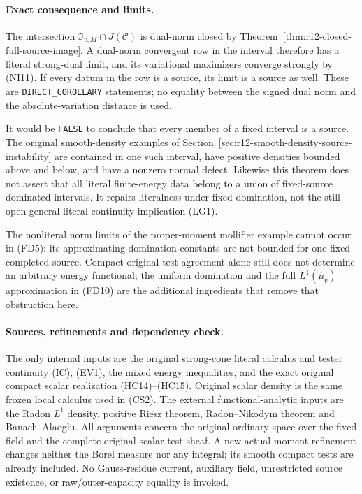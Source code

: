 \paragraph{Exact consequence and limits.}
The intersection
$\mathfrak I_{v,M}\cap J(\mathscr C)$ is dual-norm closed by
Theorem~\ref{thm:r12-closed-full-source-image}. A dual-norm
convergent row in the interval therefore has a literal strong-dual
limit, and its variational maximizers converge strongly by
\textup{(NI11)}. If every datum in the row is a source, its limit
is a source as well. These are \texttt{DIRECT\_COROLLARY}
statements; no equality between the signed dual norm and the
absolute-variation distance is used.

It would be \texttt{FALSE} to conclude that every member of a
fixed interval is a source. The original smooth-density examples
of Section~\ref{sec:r12-smooth-density-source-instability} are
contained in one such interval, have positive densities bounded
above and below, and have a nonzero normal defect. Likewise this
theorem does not assert that all literal finite-energy data belong
to a union of fixed-source dominated intervals. It repairs
literalness under fixed domination, not the still-open general
literal-continuity implication \textup{(LG1)}.

The nonliteral norm limits of the proper-moment mollifier example
cannot occur in \textup{(FD5)}: its approximating domination
constants are not bounded for one fixed completed source. Compact
original-test agreement alone still does not determine an arbitrary
energy functional; the uniform domination and the full
$L^1(\widehat\mu_v)$ approximation in \textup{(FD10)} are the
additional ingredients that remove that obstruction here.

\paragraph{Sources, refinements and dependency check.}
The only internal inputs are the original strong-cone literal
calculus and tester continuity \textup{(IC), (EV1)}, the mixed
energy inequalities, and the exact original compact scalar
realization \textup{(HC14)--(HC15)}. Original scalar density is
the same frozen local calculus used in \textup{(CS2)}. The
external functional-analytic inputs are the Radon $L^1$ density,
positive Riesz theorem, Radon--Nikodym theorem and Banach--Alaoglu.
All arguments concern the original ordinary space over the fixed
field and the complete original scalar test sheaf. A new actual
moment refinement changes neither the Borel measure nor any
integral; its smooth compact tests are already included. No
Gauss-residue current, auxiliary field, unrestricted source
existence, or raw/outer-capacity equality is invoked.
